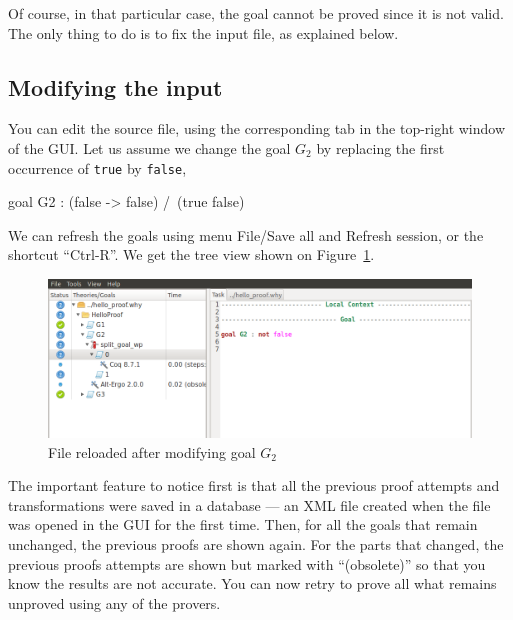 Of course, in that particular case, the goal cannot be proved since it
is not valid. The only thing to do is to fix the input file, as
explained below.

\subsection{Modifying the input}

You can edit the source file, using the corresponding tab in the
top-right window of the GUI.
Let us assume we
change the goal $G_2$ by replacing the first occurrence of \texttt{true} by
\texttt{false}, \eg
\begin{whycode}
  goal G2 : (false -> false) /\ (true \/ false)
\end{whycode}
We can refresh the goals using menu \textsf{File/Save all and Refresh
  session}, or the shortcut ``Ctrl-R''. We get the tree view shown on
Figure~\ref{fig:gui5}.

\begin{figure}[tbp]
  \includegraphics[width=\textwidth]{gui-5.png}
  \caption{File reloaded after modifying goal $G_2$}
  \label{fig:gui5}
\end{figure}

The important feature to notice first is that all the previous proof
attempts and transformations were saved in a database --- an XML file
created when the \why file was opened in the GUI for the first
time. Then, for all the goals that remain unchanged, the previous
proofs are shown again. For the parts that changed, the previous
proofs attempts are shown but marked with ``(obsolete)''
so that you
know the results are not accurate. You can now retry to prove all what
remains unproved using any of the provers.

